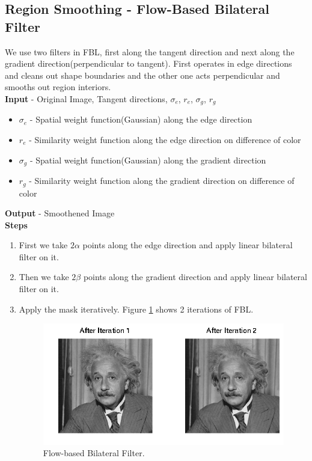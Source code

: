 \documentclass[a4paper]{article}
\begin{document}
\subsection{Region Smoothing - Flow-Based Bilateral Filter}
We use two filters in FBL, first along the tangent direction and next along the gradient direction(perpendicular to tangent).  First operates in edge directions and cleans out shape boundaries and the other one acts perpendicular and smooths out region interiors. 
\\
\textbf{Input} - Original Image, Tangent directions, $\sigma_e$, $r_e$, $\sigma_g$, $r_g$
\begin{itemize}
\item $\sigma_e$ - Spatial weight function(Gaussian) along the edge direction
\item $r_e$ - Similarity weight function along the edge direction on difference of color
\item $\sigma_g$ - Spatial weight function(Gaussian) along the gradient direction
\item $r_g$ - Similarity weight function along the gradient direction on difference of color
\end{itemize}
\textbf{Output} - Smoothened Image\\
\textbf{Steps}
\begin{enumerate}
\item First we take $2\alpha$ points along the edge direction and apply linear bilateral filter on it.
\item Then we take $2\beta$ points along the gradient direction and apply linear bilateral filter on it.
\item Apply the mask iteratively. Figure \ref{fig:fbl} shows 2 iterations of FBL.
\begin{figure}
\centering
\includegraphics[width=1\textwidth]{fbl.png}
\caption{\label{fig:fbl}Flow-based Bilateral Filter.}
\end{figure}
\end{enumerate}
\end{document}
